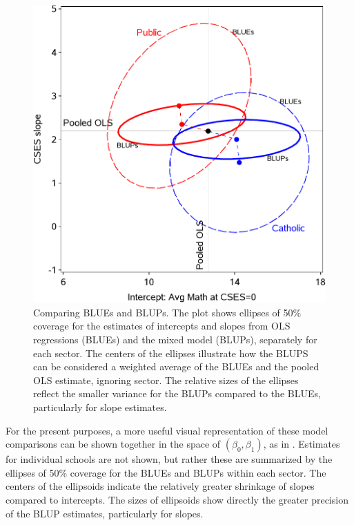 \begin{figure}[htb!]
  \centering
  \includegraphics[width=.6\textwidth,clip]{fig/hsbmix43}
  \caption{Comparing BLUEs and BLUPs. The plot shows ellipses of 50\% coverage for the estimates of intercepts and slopes
  from OLS regressions (BLUEs) and the mixed model (BLUPs), separately for each sector.
  The centers of the ellipses illustrate how the BLUPS can be considered a weighted average of the BLUEs and the
  pooled OLS estimate, ignoring sector. The relative sizes of the ellipses reflect the smaller variance for the
  BLUPs compared to the BLUEs, particularly for slope estimates. }%
  \label{fig:hsbmix43}
\end{figure}

For the present purposes, a more useful visual representation of these model comparisons can be shown together in
the space of $(\beta_0, \beta_1)$, as in .  Estimates for individual schools are not shown,
but rather these are summarized by the ellipses of 50\% coverage for the BLUEs and BLUPs within each sector.
The centers of the ellipsoids indicate the relatively greater shrinkage of slopes compared to intercepts.
The sizes of ellipsoids show directly the greater precision of the BLUP estimates, particularly for slopes.

